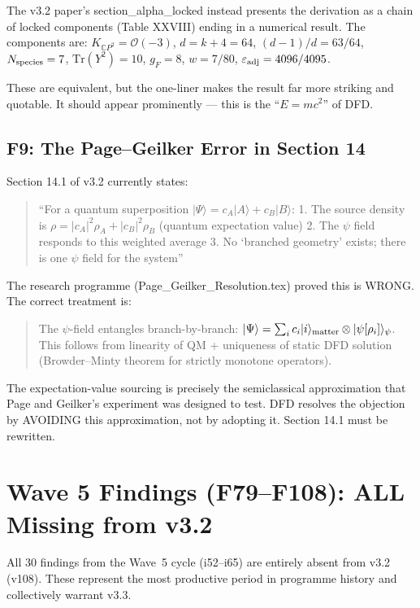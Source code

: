 \documentclass[11pt,a4paper]{article}
\begin{document}
The v3.2 paper's section\_alpha\_locked instead presents the derivation as a chain of locked components (Table XXVIII) ending in a numerical result. The components are:
$K_{\mathbb{C}P^2} = \mathcal{O}(-3)$, $d = k+4 = 64$, $(d-1)/d = 63/64$, $N_{\rm species} = 7$, $\mathrm{Tr}(Y^2) = 10$, $g_F = 8$, $w = 7/80$, $\varepsilon_{\rm adj} = 4096/4095$.

These are equivalent, but the one-liner makes the result far more striking and quotable. It should appear prominently --- this is the ``$E = mc^2$'' of DFD.

\subsection{F9: The Page--Geilker Error in Section 14}

Section 14.1 of v3.2 currently states:
\begin{quote}
``For a quantum superposition $|\Psi\rangle = c_A|A\rangle + c_B|B\rangle$:
1. The source density is $\rho = |c_A|^2\rho_A + |c_B|^2\rho_B$ (quantum expectation value)
2. The $\psi$ field responds to this weighted average
3. No `branched geometry' exists; there is one $\psi$ field for the system''
\end{quote}

The research programme (Page\_Geilker\_Resolution.tex) proved this is WRONG. The correct treatment is:
\begin{quote}
The $\psi$-field entangles branch-by-branch: $|\Psi\rangle = \sum_i c_i |i\rangle_{\rm matter} \otimes |\psi[\rho_i]\rangle_\psi$. This follows from linearity of QM + uniqueness of static DFD solution (Browder--Minty theorem for strictly monotone operators).
\end{quote}

The expectation-value sourcing is precisely the semiclassical approximation that Page and Geilker's experiment was designed to test. DFD resolves the objection by AVOIDING this approximation, not by adopting it. Section 14.1 must be rewritten.


\section{Wave 5 Findings (F79--F108): ALL Missing from v3.2}

All 30 findings from the Wave~5 cycle (i52--i65) are entirely absent from v3.2 (v108). These represent the most productive period in programme history and collectively warrant v3.3.
\end{document}
